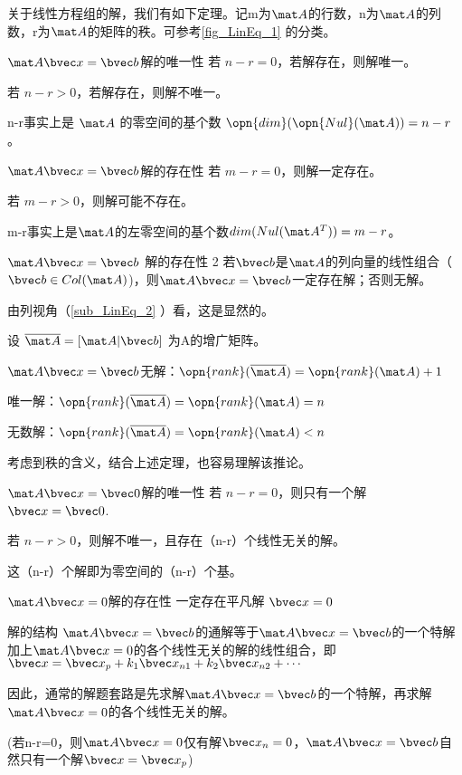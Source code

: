 

关于线性方程组的解，我们有如下定理。记m为$\mat A$的行数，n为$\mat A$的列数，r为$\mat A$的矩阵的秩。可参考\autoref{fig_LinEq_1} 的分类。

\begin{theorem}{$\mat A \bvec x=\bvec b$解的唯一性}
若 $n-r=0$，若解存在，则解唯一。

若 $n-r>0$，若解存在，则解不唯一。
\end{theorem}
n-r事实上是 $\mat A$ 的零空间的基个数 $\opn{dim}(\opn{Nul}(\mat A))=n-r$。

\begin{theorem}{$\mat A \bvec x=\bvec b$解的存在性}
若 $m-r=0$，则解一定存在。

若 $m-r>0$，则解可能不存在。
\end{theorem}
m-r事实上是$\mat A$的左零空间的基个数$dim(Nul(\mat A^T))=m-r$。

\begin{theorem}{$\mat A \bvec x=\bvec b$ 解的存在性 2}
若$\bvec b$是$\mat A$的列向量的线性组合（$\bvec b \in Col(\mat A)$)，则$\mat A \bvec x=\bvec b$一定存在解；否则无解。
\end{theorem}
由列视角（\autoref{sub_LinEq_2} ）看，这是显然的。

\begin{corollary}{}
设 $\overline{\mat A} = [\mat A | \bvec b] $ 为A的增广矩阵。

$\mat A \bvec x=\bvec b$无解：$\opn{rank}(\overline{\mat A})=\opn{rank}(\mat A)+1$

唯一解：$\opn{rank}(\overline{\mat A})=\opn{rank}(\mat A)=n$

无数解：$\opn{rank}(\overline{\mat A})=\opn{rank}(\mat A)<n$
\end{corollary}
考虑到秩的含义，结合上述定理，也容易理解该推论。

\begin{theorem}{$\mat A \bvec x=\bvec 0$解的唯一性}
若 $n-r=0$，则只有一个解 $\bvec x = \bvec 0$.

若 $n-r>0$，则解不唯一，且存在（n-r）个线性无关的解。
\end{theorem}
这（n-r）个解即为零空间的（n-r）个基。

\begin{theorem}{$\mat A \bvec x=0$解的存在性}
一定存在平凡解 $\bvec x=0$
\end{theorem}

\begin{theorem}{解的结构}
$\mat A \bvec x=\bvec b$的通解等于$\mat A \bvec x=\bvec b$的一个特解加上$\mat A \bvec x=0$的各个线性无关的解的线性组合，即$\bvec x = \bvec x_p +k_1\bvec x_{n1}+k_2\bvec x_{n2}+\cdots$

因此，通常的解题套路是先求解$\mat A \bvec x=\bvec b$的一个特解，再求解$\mat A \bvec x=0$的各个线性无关的解。

(若n-r=0，则$\mat A \bvec x=0$仅有解$\bvec x_n=0$，$\mat A \bvec x=\bvec b$自然只有一个解$\bvec x = \bvec x_p$)
\end{theorem}

